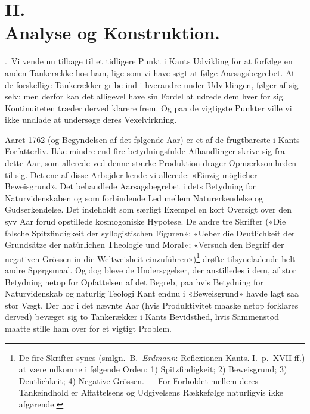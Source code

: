 \documentclass[12pt,a4paper]{article}
\begin{document}
\section*{II.\\ Analyse og Konstruktion.}

.\ Vi vende nu tilbage til et tidligere Punkt i Kants
Udvikling for at forfølge en anden Tankerække hos ham, lige som vi have
søgt at følge Aarsagsbegrebet. At de forskellige Tankerækker gribe ind i
hverandre under Udviklingen, følger af sig selv; men derfor kan det
alligevel have sin Fordel at udrede dem hver for sig. Kontinuiteten
træder derved klarere frem. Og paa de vigtigste Punkter ville vi ikke
undlade at undersøge deres Vexelvirkning.

Aaret 1762 (og Begyndelsen af det følgende Aar) er et af de frugtbareste
i Kants Forfatterliv. Ikke mindre end fire betydningsfulde Afhandlinger
skrive sig fra dette Aar, som allerede ved denne stærke Produktion drager
Opmærksomheden til sig. Det ene af disse Arbejder kende vi allerede:
«Einzig möglicher Beweisgrund». Det behandlede Aarsagsbegrebet i dets
Betydning for Naturvidenskaben og som forbindende Led mellem
Naturerkendelse og Gudserkendelse. Det indeholdt som særligt Exempel en
kort Oversigt over den syv Aar forud opstillede kosmogoniske Hypotese. De
andre tre Skrifter («Die falsche Spitzfindigkeit der syllogistischen
Figuren»; «Ueber die Deutlichkeit der Grundsätze der natürlichen Theologie
und Moral»; «Versuch den Begriff der negativen Grössen in die Weltweisheit
einzuführen»)\footnote{De fire Skrifter synes (smlgn.\ B.\ \emph{Erdmann}:
Reflexionen Kants. I.\ p.\ XVII ff.) at være udkomne i følgende
Orden: 1) Spitzfindigkeit; 2) Beweisgrund; 3) Deutlichkeit; 4) Negative
Grössen. --- For Forholdet mellem deres Tankeindhold er Affattelsens og
Udgivelsens Rækkefølge naturligvis ikke afgørende.} drøfte tilsyneladende
helt andre Spørgsmaal. Og dog bleve de Undersøgelser, der anstilledes i
dem, af stor Betydning netop for Opfattelsen af det Begreb, paa hvis
Betydning for Naturvidenskab og naturlig Teologi Kant endnu i
«Beweisgrund» havde lagt saa stor Vægt. Der har i det nævnte Aar (hvis
Produktivitet maaske netop forklares derved) bevæget sig to Tankerækker i
Kants Bevidsthed, hvis Sammenstød maatte stille ham over for et vigtigt
Problem.
\end{document}
